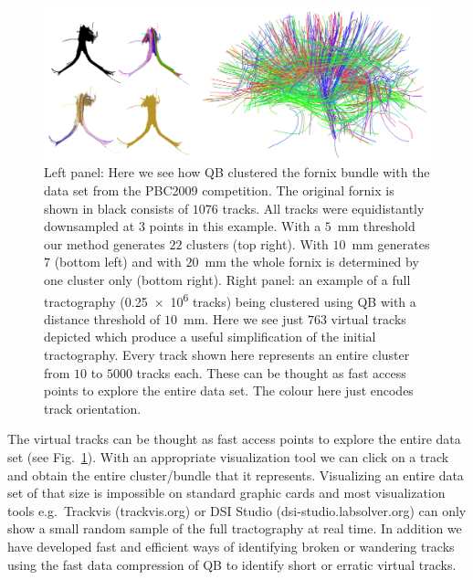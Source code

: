 \documentclass[preprint,authoryear,a4paper,10pt,onecolumn]{elsarticle}
\begin{document}
\begin{figure}
\begin{centering}
\includegraphics[scale=0.6]{last_figures/LSC_simple}
\par\end{centering}
\caption{Left panel: Here we see how QB clustered the fornix bundle with the
  data set from the PBC2009 competition. The original fornix is shown in
  black consists of $1076$ tracks. All tracks were equidistantly
  downsampled at $3$ points in this example. With a $5$~mm threshold our
  method generates $22$ clusters (top right). With $10$~mm generates $7$
  (bottom left) and with $20$~mm the whole fornix is determined by one
  cluster only (bottom right). Right panel: an example of a full tractography
  (\num{0.25e6} tracks) being clustered using QB with a distance threshold
  of $10$~mm. Here we see just $763$ virtual tracks depicted which
  produce a useful simplification of the initial tractography. Every
  track shown here represents an entire cluster from $10$ to $5000$
  tracks each. These can be thought as fast access points to explore the
  entire data set. The colour here just encodes track
  orientation.\label{Flo:QB_fornix}}
\centering{}
\end{figure}

The virtual tracks can be thought as fast access points to explore the
entire data set (see Fig.~\ref{Flo:QB_fornix}). With an appropriate
visualization tool we can click on a track and obtain the entire
cluster/bundle that it represents. Visualizing an entire data set of
that size is impossible on standard graphic cards and most visualization
tools e.g.~Trackvis (trackvis.org) or DSI Studio
(dsi-studio.labsolver.org) can only show a small random sample of the
full tractography at real time. In addition we have developed fast and
efficient ways of identifying broken or wandering tracks using the fast data
compression of QB to identify short or erratic virtual tracks.

\end{document}
